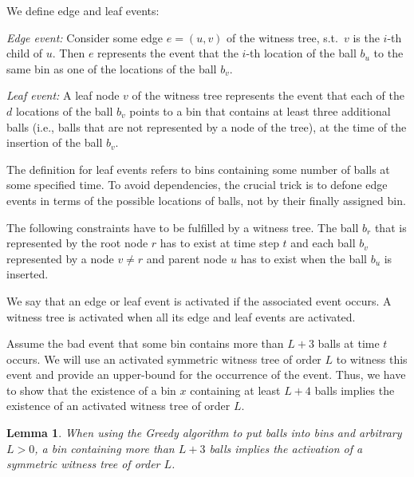 \documentclass[a4paper,12pt]{article}
\newtheorem{lemma}{Lemma}
\begin{document}
We define edge and leaf events:
\begin{compactitem}
\item \emph{Edge event:} Consider some edge $e = (u,v)$ of the witness tree, s.t.~$v$ is the $i$-th child of $u$. Then $e$ represents the event that the $i$-th location of the ball $b_u$ to the same bin as one of the locations of the ball $b_v$. 
\item \emph{Leaf event:} A leaf node $v$ of the witness tree represents the event that each of the $d$ locations of the ball $b_v$ points to a bin that contains at least three additional balls (i.e., balls that are not represented by a node of the tree), at the time of the insertion of the ball $b_v$.

\end{compactitem}
The definition for leaf events refers to bins containing some number of balls at some specified time. To avoid dependencies, the crucial trick is to defone edge events in terms of the possible locations of balls, not by their finally assigned bin. 

The following constraints have to be fulfilled by a witness tree. The ball $b_r$ that is represented by the root node $r$ has to exist at time step $t$ and each ball $b_v$ represented by a node $v \neq r$ and parent node $u$ has to exist when the ball $b_u$ is inserted.

We say that an edge or leaf event is activated if the associated event occurs. A witness tree is activated when all its edge and leaf events are activated. 

Assume the bad event that some bin contains more than $L+3$ balls at time $t$ occurs. We will use an activated symmetric witness tree of order $L$ to witness this event and provide an upper-bound for the occurrence of the event. Thus, we have to show that the existence of a bin $x$ containing at least $L+4$ balls implies the existence of an activated witness tree of order $L$. 

\begin{lemma}
When using the Greedy algorithm to put balls into bins and arbitrary $L > 0$, a bin containing more than $L+3$ balls implies the activation of a symmetric witness tree of order $L$.
\end{lemma}
\end{document}
